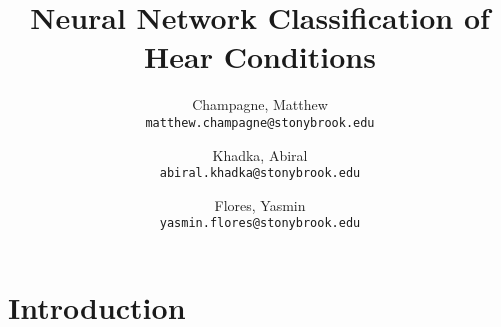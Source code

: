 \documentclass[twocolumn]{article}
\begin{document}
\title{Neural Network Classification of Hear Conditions}
\author{
  Champagne, Matthew \\
  \texttt{matthew.champagne@stonybrook.edu}
  \and
  Khadka, Abiral \\
  \texttt{abiral.khadka@stonybrook.edu}
  \and
  Flores, Yasmin \\
  \texttt{yasmin.flores@stonybrook.edu}
}

\maketitle

\section{Introduction}




\appendix
\end{document}
